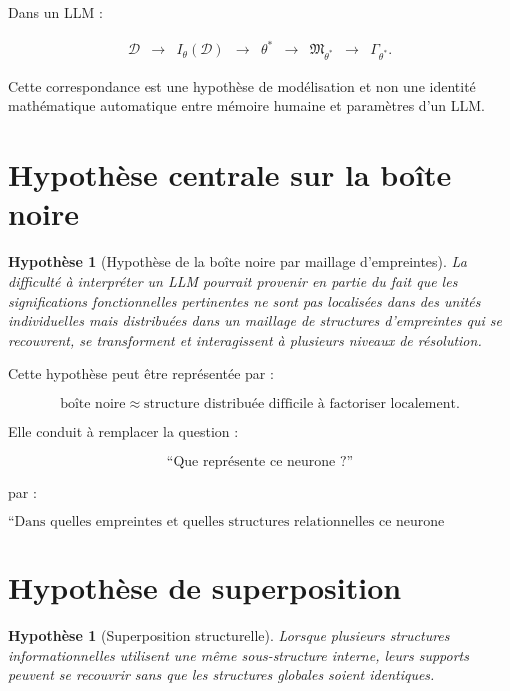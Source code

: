 \documentclass[11pt,a4paper]{article}
\newtheorem{hypothesis}[definition]{Hypothèse}
\newcommand{\D}{\mathcal D}
\begin{document}
Dans un LLM :

\[
\boxed{
\begin{array}{ccccccccc}
\D
&
\longrightarrow
&
I_\theta(\D)
&
\longrightarrow
&
\theta^\ast
&
\longrightarrow
&
\mathfrak M_{\theta^\ast}
&
\longrightarrow
&
\Gamma_{\theta^\ast}.
\end{array}
}
\]

Cette correspondance est une hypothèse de modélisation et non une identité
mathématique automatique entre mémoire humaine et paramètres d'un LLM.

\section{Hypothèse centrale sur la boîte noire}

\begin{hypothesis}[Hypothèse de la boîte noire par maillage d'empreintes]
La difficulté à interpréter un LLM pourrait provenir en partie du fait que
les significations fonctionnelles pertinentes ne sont pas localisées dans
des unités individuelles mais distribuées dans un maillage de structures
d'empreintes qui se recouvrent, se transforment et interagissent à plusieurs
niveaux de résolution.
\end{hypothesis}

Cette hypothèse peut être représentée par :

\[
\boxed{
\text{boîte noire}
\approx
\text{structure distribuée difficile à factoriser localement}.
}
\]

Elle conduit à remplacer la question :

\[
\text{``Que représente ce neurone ?''}
\]

par :

\[
\boxed{
\text{``Dans quelles empreintes et quelles structures relationnelles
ce neurone intervient-il ?''}
}
\]

\section{Hypothèse de superposition}

\begin{hypothesis}[Superposition structurelle]
Lorsque plusieurs structures informationnelles utilisent une même
sous-structure interne, leurs supports peuvent se recouvrir sans que les
structures globales soient identiques.
\end{hypothesis}
\end{document}
